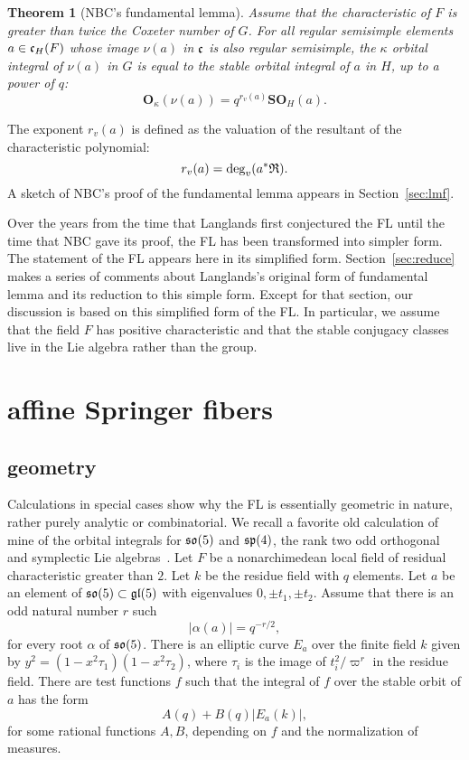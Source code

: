 \documentclass[brochure,english,12pt]{bourbaki}
\newtheorem{theorem}[equation]{Theorem}
\def\SO{{\mathbf {SO}}}
\def\OO{{\mathbf O}}
\def\so{\frak{so}}
\def\sp{\frak{sp}}
\def\gl{\frak{gl}}
\def\cc{\frak{c}}
\def\RDIV{{\frak{R}}}
\begin{document}
\begin{theorem}[NBC's fundamental lemma]
Assume that the characteristic of $F$ is greater than twice the Coxeter number of $G$.
For all regular semisimple elements $a\in \cc_H(F)$ whose image
$\nu(a)$ in $\cc$ is also regular semisimple, the $\kappa$ orbital integral of $\nu(a)$ in $G$ is
equal to the stable orbital integral of $a$ in $H$, up to a power of $q$:
\[
\OO_\kappa(\nu(a)) = q^{r_v(a)}\SO_H(a).
\]
\end{theorem}

The  exponent $r_v(a)$ is defined as the valuation of the resultant of the characteristic polynomial:
\[
r_v(a) = \deg_v(a^*\RDIV).
\]
A sketch of NBC's proof of the fundamental
lemma appears in Section~\ref{sec:lmf}. 


Over the years from the time that Langlands first conjectured the FL
until the time that NBC gave its proof, the FL has been transformed
into simpler form.  The statement of the FL appears here in its
simplified form.  Section~\ref{sec:reduce} makes a series of comments
about Langlands's original form of fundamental lemma and its reduction
to this simple form.  Except for that section, our discussion is based
on this simplified form of the FL.  In particular, we assume that the
field $F$ has positive characteristic and that the stable conjugacy
classes live in the Lie algebra rather than the group.


\section{affine Springer fibers}

\subsection{geometry}

Calculations in special cases show why the FL is
essentially geometric in nature, rather purely analytic or
combinatorial. We recall a favorite old calculation of mine of the
orbital integrals for $\so(5)$ and $\sp(4)$, the rank two odd
orthogonal and symplectic Lie algebras~\cite{hyperelliptic-curves}.  
Let $F$ be a nonarchimedean
local field of residual characteristic greater than $2$.  Let $k$ be
the residue field with $q$ elements.  Let $a$ be an element of
$\so(5)\subset \gl(5)$ with eigenvalues $0,\pm t_1,\pm t_2$.  Assume
that there is an odd natural number $r$ such
\[
|\alpha(a)| = q^{-r/2},
\]
for every root $\alpha$ of $\so(5)$. 
There is an elliptic curve $E_a$ over the finite field $k$ given by
$y^2 = (1-x^2\tau_1)(1-x^2\tau_2)$, where $\tau_i$ is the image
of $t_i^2/\varpi^r$ in the residue field.  There are test functions $f$ 
such that the integral of $f$ over the stable orbit
of $a$ has the form
\begin{equation}\label{eqn:elliptic}
A(q) + B(q) | E_a(k)|,
\end{equation}
for some rational functions $A,B$, depending on $f$ and the normalization of measures.
\end{document}
